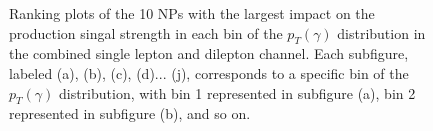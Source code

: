 \begin{figure}[ht]
  \quad \quad
  \quad \quad
  \quad \quad

  \caption{Ranking plots of the 10 NPs with the largest impact on the \tty production singal strength in each bin of the $p_T(\gamma)$ distribution in the combined single 
  lepton and dilepton channel. Each subfigure, labeled (a), (b), (c), (d)... (j), corresponds to a specific bin 
  of the $p_T(\gamma)$ distribution, with bin 1 represented in subfigure (a), bin 2 represented in 
  subfigure (b), and so on.}
  \label{fig:ranking_sldl_tty_prod_mu_blinded}
\end{figure}
\FloatBarrier


